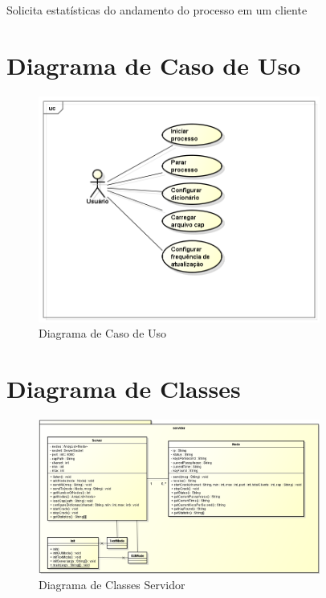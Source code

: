 \documentclass[12pt,a4paper]{abnt}
\begin{document}
		{Solicita estatísticas do andamento do processo em um cliente}
		{
		}

		\clearpage
		\section{Diagrama de Caso de Uso}

		\begin{figure}[htp]
			\begin{center}
			  \includegraphics[width=350px]{casoDeUso}
			  \caption{Diagrama de Caso de Uso}
			  \label{fig:casoDeUso}
			\end{center}
		\end{figure}
		\FloatBarrier

		\clearpage
		\section{Diagrama de Classes}

			\begin{figure}[htp]
				\begin{center}
				  \includegraphics[width=350px]{diagramaClassesServidor}
				  \caption{Diagrama de Classes Servidor}
				  \label{fig:diagramaClassesServidor}
				\end{center}
			\end{figure}
\end{document}
